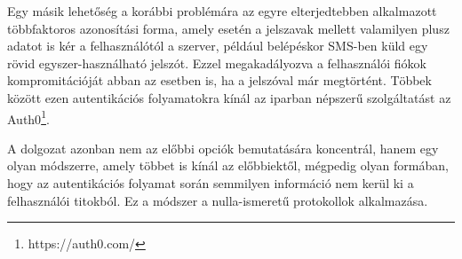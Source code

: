 Egy másik lehetőség a korábbi problémára az egyre elterjedtebben alkalmazott többfaktoros azonosítási forma, amely esetén a jelszavak mellett valamilyen plusz adatot is kér a felhasználótól a szerver, például belépéskor SMS-ben küld egy rövid egyszer-használható jelszót. Ezzel megakadályozva a felhasználói fiókok kompromitációját abban az esetben is, ha a jelszóval már megtörtént. Többek között ezen autentikációs folyamatokra kínál az iparban népszerű szolgáltatást az Auth0\footnote{https://auth0.com/}.

A dolgozat azonban nem az előbbi opciók bemutatására koncentrál, hanem egy olyan módszerre, amely többet is kínál az előbbiektől, mégpedig olyan formában, hogy az autentikációs folyamat során semmilyen információ nem kerül ki a felhasználói titokból. Ez a módszer a nulla-ismeretű protokollok alkalmazása.